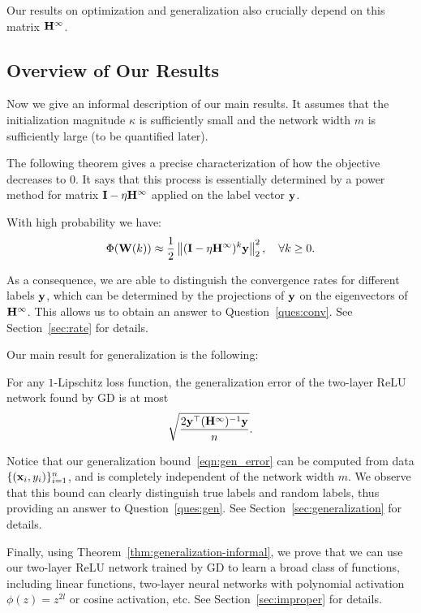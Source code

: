Our results on optimization and generalization also crucially depend on this matrix $\mathbf{H}^\infty$.

\subsection{Overview of Our Results}

Now we give an informal description of our main results.
It assumes that the initialization magnitude $\kappa$ is sufficiently small and the network width $m$ is sufficiently large (to be quantified later).



The following theorem gives a precise characterization of how the objective decreases to $0$.
It says that this process is essentially determined by a power method for matrix $\mathbf{I}-\eta\mathbf{H}^\infty$ applied on the label vector $\mathbf{y}$.
\begin{thm} \label{thm:rate-informal}
	With high probability we have:
	\[
	\Phi(\mathbf{W}(k)) \approx \frac12 \left\|(\mathbf{I} - \eta \mathbf{H}^\infty)^k \mathbf{y}\right\|_2^2, \quad \forall k\ge 0.
	\]
\end{thm}
As a consequence, we are able to distinguish the convergence rates for different labels $\mathbf{y}$, which can be determined by the projections of $\mathbf{y}$ on the eigenvectors of $\mathbf{H}^\infty$.
This allows us to obtain an answer to Question~\ref{ques:conv}. See Section~\ref{sec:rate} for details.


Our main result for generalization is the following:
\begin{thm} \label{thm:generalization-informal}
	For any $1$-Lipschitz loss function, the generalization error of the two-layer ReLU network found by GD is at most
	\begin{equation} \label{eqn:gen_error}
		\sqrt{\frac{2 \mathbf{y}^\top (\mathbf{H}^\infty)^{-1} \mathbf{y}}{n}}.
	\end{equation}
\end{thm}
Notice that our generalization bound~\eqref{eqn:gen_error} can be computed from data $\{(\mathbf{x}_i, y_i)\}_{i=1}^n$, and is completely independent of the network width $m$.
We observe that this bound can clearly distinguish true labels and random labels, thus providing an answer to Question~\ref{ques:gen}. See Section~\ref{sec:generalization} for details.


Finally, using Theorem~\ref{thm:generalization-informal}, we prove that we can use our two-layer ReLU network trained by GD to learn a broad class of functions, including linear functions, two-layer neural networks with polynomial activation $\phi(z) = z^{2l}$ or cosine activation, etc.
See Section~\ref{sec:improper} for details.


